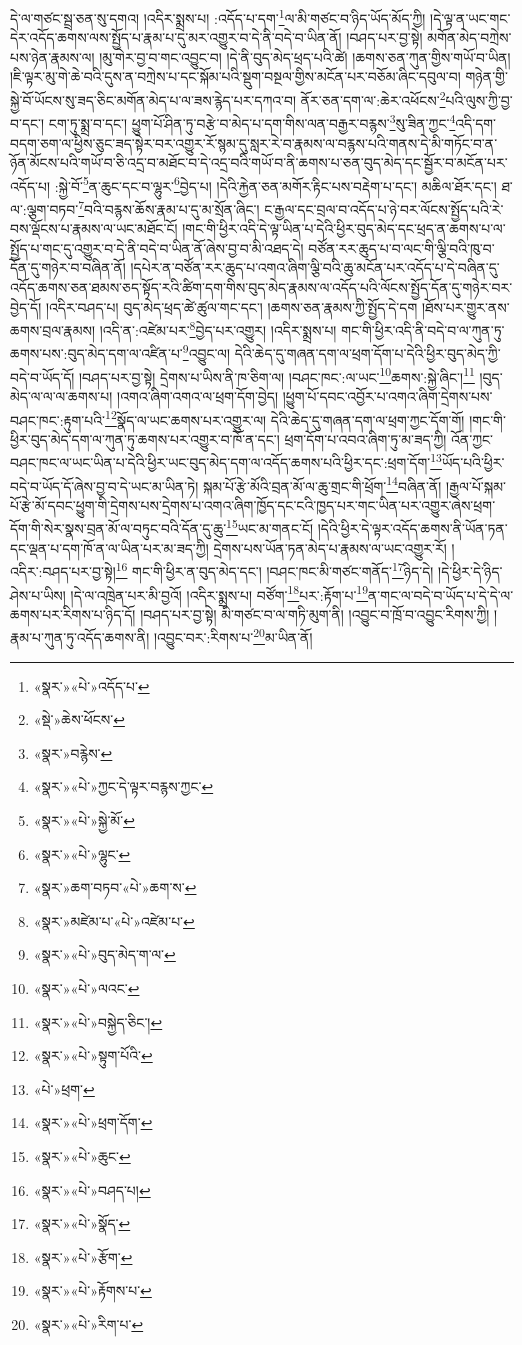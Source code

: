 དེ་ལ་གཙང་སྦྲ་ཅན་སུ་དགའ། །འདིར་སྨྲས་པ། :འདོད་པ་དག་\footnote{«སྣར་»«པེ་»འདོད་པ་}ལ་མི་གཙང་བ་ཉིད་ཡོད་མོད་ཀྱི། །དེ་ལྟ་ན་ཡང་གང་དེར་འདོད་ཆགས་ལས་སྤྱོད་པ་རྣམ་པ་དུ་མར་འགྱུར་བ་དེ་ནི་བདེ་བ་ཡིན་ནོ། །བཤད་པར་བྱ་སྟེ། མགོན་མེད་བཀྲེས་པས་ཉེན་རྣམས་ལ། །མུ་གེར་བྱ་བ་གང་འབྱུང་བ། །དེ་ནི་བུད་མེད་ཕྲད་པའི་ཚེ། །ཆགས་ཅན་ཀུན་གྱིས་གཡོ་བ་ཡིན། །ཇི་ལྟར་མུ་གེ་ཆེ་བའི་དུས་ན་བཀྲེས་པ་དང་སྐོམ་པའི་སྡུག་བསྔལ་གྱིས་མངོན་པར་བཅོམ་ཞིང་དབུལ་བ། གཉེན་གྱི་སྐྱེ་བོ་ཡོངས་སུ་ཟད་ཅིང་མགོན་མེད་པ་ལ་ཟས་རྙེད་པར་དཀའ་བ། ནོར་ཅན་དག་ལ་:ཆེར་འཕོངས་\footnote{«སྡེ་»ཆེས་ཕོངས་}པའི་ལུས་ཀྱི་བྱ་བ་དང་། ངག་ཏུ་སྨྲ་བ་དང་། ཕྱུག་པོ་ཤིན་ཏུ་བརྩེ་བ་མེད་པ་དག་གིས་ལན་བརྒྱར་བརྙས་\footnote{«སྣར་»བརྙེས་}སུ་ཟིན་ཀྱང་\footnote{«སྣར་»«པེ་»ཀྱང་དེ་ལྟར་བརྙས་ཀྱང་}འདི་དག་བདག་ཅག་ལ་ཕྱིས་ཅུང་ཟད་སྟེར་བར་འགྱུར་རོ་སྙམ་དུ་སླར་རེ་བ་རྣམས་ལ་བརྙས་པའི་གནས་དེ་མི་གཏོང་བ་ན་ཉོན་མོངས་པའི་གཡོ་བ་ཅི་འདྲ་བ་མཐོང་བ་དེ་འདྲ་བའི་གཡོ་བ་ནི་ཆགས་པ་ཅན་བུད་མེད་དང་སྦྱོར་བ་མངོན་པར་འདོད་པ། :སྐྱེ་བོ་\footnote{«སྣར་»«པེ་»སྐྱེ་མོ་}ན་ཆུང་དང་བ་ལྷུར་\footnote{«སྣར་»«པེ་»ལྷུང་}བྱེད་པ། །དེའི་རྐྱེན་ཅན་མགོར་རྟིང་པས་བརྡེག་པ་དང་། མཆིལ་ཐོར་དང་། ཐ་ལ་:ལྕག་བཏབ་\footnote{«སྣར་»ཆག་བཏབ་«པེ་»ཆག་ས་}བའི་བརྙས་ཆོས་རྣམ་པ་དུ་མ་སྲོན་ཞིང་། ང་རྒྱལ་དང་བྲལ་བ་འདོད་པ་ཉེ་བར་ལོངས་སྤྱོད་པའི་རེ་བས་ལྡོངས་པ་རྣམས་ལ་ཡང་མཐོང་ངོ། །གང་གི་ཕྱིར་འདི་དེ་ལྟ་ཡིན་པ་དེའི་ཕྱིར་བུད་མེད་དང་ཕྲད་ན་ཆགས་པ་ལ་སྤྱོད་པ་གང་དུ་འགྱུར་བ་དེ་ནི་བདེ་བ་ཡིན་ནོ་ཞེས་བྱ་བ་མི་འཐད་དེ། བཙོན་རར་ཆུད་པ་བ་ལང་གི་ལྕི་བའི་ཁུ་བ་དོན་དུ་གཉེར་བ་བཞིན་ནོ། །དཔེར་ན་བཙོན་རར་ཆུད་པ་འགའ་ཞིག་ལྕི་བའི་ཆུ་མངོན་པར་འདོད་པ་དེ་བཞིན་དུ་འདོད་ཆགས་ཅན་ཐམས་ཅད་སྟོད་རའི་ཚིག་དག་གིས་བུད་མེད་རྣམས་ལ་འདོད་པའི་ལོངས་སྤྱོད་དོན་དུ་གཉེར་བར་བྱེད་དོ། །འདིར་བཤད་པ། བུད་མེད་ཕྲད་ཚེ་ཚུལ་གང་དང་། །ཆགས་ཅན་རྣམས་ཀྱི་སྤྱོད་དེ་དག །ཐོས་པར་གྱུར་ནས་ཆགས་བྲལ་རྣམས། །འདི་ན་:འཛེམ་པར་\footnote{«སྣར་»མཛེམ་པ་«པེ་»འཛེམ་པ་}བྱེད་པར་འགྱུར། །འདིར་སྨྲས་པ། གང་གི་ཕྱིར་འདི་ནི་བདེ་བ་ལ་ཀུན་ཏུ་ཆགས་པས་:བུད་མེད་དག་ལ་འཛིན་པ་\footnote{«སྣར་»«པེ་»བུད་མེད་ག་ལ་}འབྱུང་ལ། དེའི་ཆེད་དུ་གཞན་དག་ལ་ཕྲག་དོག་པ་དེའི་ཕྱིར་བུད་མེད་ཀྱི་བདེ་བ་ཡོད་དོ། །བཤད་པར་བྱ་སྟེ། དྲེགས་པ་ཡིས་ནི་ཁ་ཅིག་ལ། །བཤང་ཁང་:ལ་ཡང་\footnote{«སྣར་»«པེ་»ལའང་}ཆགས་:སྐྱེ་ཞིང་།\footnote{«སྣར་»«པེ་»བསྐྱེད་ཅིང་།} །བུད་མེད་ལ་ལ་ལ་ཆགས་པ། །འགའ་ཞིག་འགའ་ལ་ཕྲག་དོག་བྱེད། །ཕྱུག་པོ་དབང་འབྱོར་པ་འགའ་ཞིག་དྲེགས་པས་བཤང་ཁང་:རྟུག་པའི་\footnote{«སྣར་»«པེ་»སྟུག་པོའི་}སྣོད་ལ་ཡང་ཆགས་པར་འགྱུར་ལ། དེའི་ཆེད་དུ་གཞན་དག་ལ་ཕྲག་ཀྱང་དོག་གོ། །གང་གི་ཕྱིར་བུད་མེད་དག་ལ་ཀུན་ཏུ་ཆགས་པར་འགྱུར་བ་ཁོ་ན་དང་། ཕྲག་དོག་པ་འབའ་ཞིག་ཏུ་མ་ཟད་ཀྱི། འོན་ཀྱང་བཤང་ཁང་ལ་ཡང་ཡིན་པ་དེའི་ཕྱིར་ཡང་བུད་མེད་དག་ལ་འདོད་ཆགས་པའི་ཕྱིར་དང་:ཕྲག་དོག་\footnote{«པེ་»ཕྲག་}ཡོད་པའི་ཕྱིར་བདེ་བ་ཡོད་དོ་ཞེས་བྱ་བ་དེ་ཡང་མ་ཡིན་ཏེ། སྐམ་པོ་རྩེ་མོའི་བྲན་མོ་ལ་ཆུ་གྲང་གི་ཕྲོག་\footnote{«སྣར་»«པེ་»ཕྲག་དོག་}བཞིན་ནོ། །རྒྱལ་པོ་སྐམ་པོ་རྩེ་མོ་དབང་ཕྱུག་གི་དྲེགས་པས་དྲེགས་པ་འགའ་ཞིག་ཁྱོད་དང་ངའི་ཁྱད་པར་གང་ཡིན་པར་འགྱུར་ཞེས་ཕྲག་དོག་གི་སེར་སྣས་བྲན་མོ་ལ་བཏུང་བའི་དོན་དུ་ཆུ་\footnote{«སྣར་»«པེ་»ཆུང་}ཡང་མ་གནང་ངོ། །དེའི་ཕྱིར་དེ་ལྟར་འདོད་ཆགས་ནི་ཡོན་ཏན་དང་ལྡན་པ་དག་ཁོ་ན་ལ་ཡིན་པར་མ་ཟད་ཀྱི། དྲེགས་པས་ཡོན་ཏན་མེད་པ་རྣམས་ལ་ཡང་འགྱུར་རོ། །འདིར་:བཤད་པར་བྱ་སྟེ།\footnote{«སྣར་»«པེ་»བཤད་པ།} གང་གི་ཕྱིར་ན་བུད་མེད་དང་། །བཤང་ཁང་མི་གཙང་གནོད་\footnote{«སྣར་»«པེ་»སྣོད་}ཉིད་དེ། །དེ་ཕྱིར་དེ་ཉིད་ཤེས་པ་ཡིས། །དེ་ལ་འཁྲེན་པར་མི་བྱའོ། །འདིར་སྨྲས་པ། བཙོག་\footnote{«སྣར་»«པེ་»རྩོག་}པར་:རྟོག་པ་\footnote{«སྣར་»«པེ་»རྟོགས་པ་}ན་གང་ལ་བདེ་བ་ཡོད་པ་དེ་དེ་ལ་ཆགས་པར་རིགས་པ་ཉིད་དོ། །བཤད་པར་བྱ་སྟེ། མི་གཙང་བ་ལ་གཏི་མུག་ནི། །འབྱུང་བ་ཁྲོ་བ་འབྱུང་རིགས་ཀྱི། །རྣམ་པ་ཀུན་ཏུ་འདོད་ཆགས་ནི། །འབྱུང་བར་:རིགས་པ་\footnote{«སྣར་»«པེ་»རིག་པ་}མ་ཡིན་ནོ། 